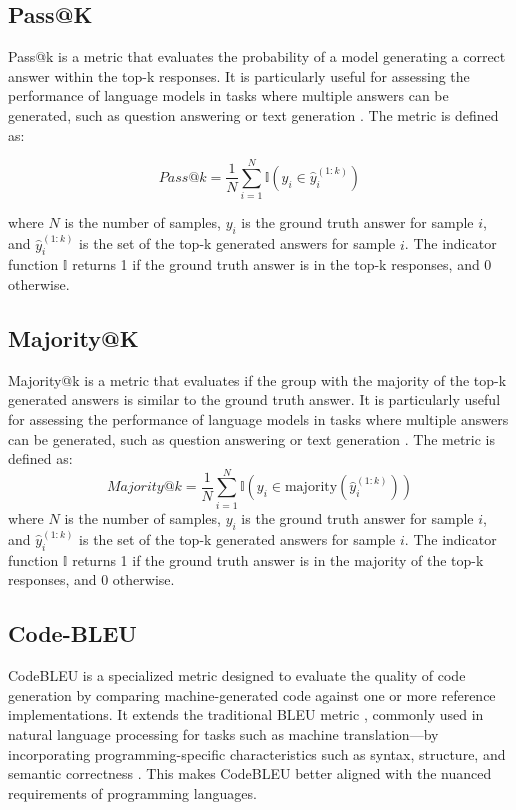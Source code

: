 \subsection{Pass@K}

Pass@k is a metric that evaluates the probability of a model generating a correct answer within the top-k responses. It is particularly useful for assessing the performance of language models in tasks where multiple answers can be generated, such as question answering or text generation \citep{Levi2024SimpleModelInferenceScalingLaws}. The metric is defined as:

\begin{equation}
    Pass@k = \frac{1}{N} \sum_{i=1}^{N} \mathbb{I}(y_i \in \hat{y}_i^{(1:k)})
\end{equation}

where \(N\) is the number of samples, \(y_i\) is the ground truth answer for sample \(i\), and \(\hat{y}_i^{(1:k)}\) is the set of the top-k generated answers for sample \(i\). The indicator function \(\mathbb{I}\) returns 1 if the ground truth answer is in the top-k responses, and 0 otherwise.

\subsection{Majority@K}

Majority@k is a metric that evaluates if the group with the majority of the top-k generated answers is similar to the ground truth answer. It is particularly useful for assessing the performance of language models in tasks where multiple answers can be generated, such as question answering or text generation \citep{Wang2023SelfConsistency}. The metric is defined as:
\begin{equation}
    Majority@k = \frac{1}{N} \sum_{i=1}^{N} \mathbb{I}(y_i \in \text{majority}(\hat{y}_i^{(1:k)}))
\end{equation}
where \(N\) is the number of samples, \(y_i\) is the ground truth answer for sample \(i\), and \(\hat{y}_i^{(1:k)}\) is the set of the top-k generated answers for sample \(i\). The indicator function \(\mathbb{I}\) returns 1 if the ground truth answer is in the majority of the top-k responses, and 0 otherwise.


\subsection{Code-BLEU}

CodeBLEU is a specialized metric designed to evaluate the quality of code generation by comparing machine-generated code against one or more reference implementations. It extends the traditional BLEU metric \citep{Papineni2002BLEU}, commonly used in natural language processing for tasks such as machine translation—by incorporating programming-specific characteristics such as syntax, structure, and semantic correctness \citep{Ren2020CodeBLEU}. This makes CodeBLEU better aligned with the nuanced requirements of programming languages.

